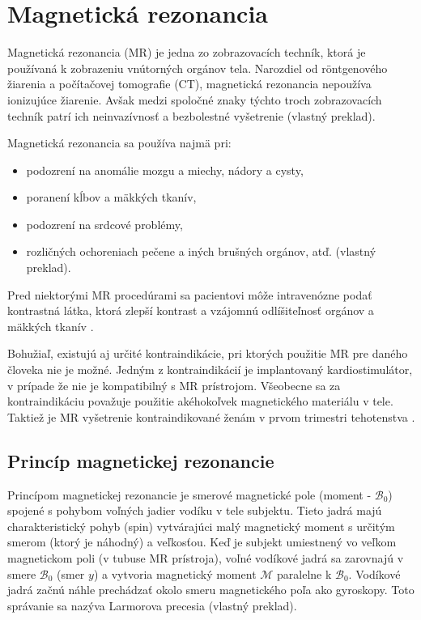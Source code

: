 \chapter {Magnetická rezonancia}
Magnetická rezonancia (MR) je jedna zo zobrazovacích techník, ktorá je používaná k zobrazeniu vnútorných orgánov tela.
Narozdiel od röntgenového žiarenia a počítačovej tomografie (CT), magnetická rezonancia nepoužíva ionizujúce žiarenie. Avšak medzi spoločné znaky týchto troch zobrazovacích techník patrí ich neinvazívnosť a bezbolestné vyšetrenie \cite{basic_principles_of_mri} (vlastný preklad).

Magnetická rezonancia sa používa najmä pri:
\begin {itemize}
\item {podozrení na anomálie mozgu a miechy, nádory a cysty,}
\item {poranení kĺbov a mäkkých tkanív,}
\item {podozrení na srdcové problémy,}
\item {rozličných ochoreniach pečene a iných brušných orgánov, atď. \cite{mr_usage} (vlastný preklad).}
\end {itemize}

Pred niektorými MR procedúrami sa pacientovi môže intravenózne podať kontrastná látka, ktorá zlepší kontrast a vzájomnú odlíšiteľnosť orgánov a mäkkých tkanív \cite{contrast_agents}.

Bohužiaľ, existujú aj určité kontraindikácie, pri ktorých použitie MR pre daného človeka nie je možné.
Jedným z kontraindikácií je implantovaný kardiostimulátor, v prípade že nie je kompatibilný s MR prístrojom. Všeobecne sa za kontraindikáciu považuje použitie akéhokoľvek magnetického materiálu v tele. Taktiež je MR vyšetrenie kontraindikované ženám v prvom trimestri tehotenstva \cite{mr_contraindications}.

\clearpage

\section {Princíp magnetickej rezonancie}
Princípom magnetickej rezonancie je smerové magnetické pole (moment - $\mathcal{B}_{0}$) spojené s pohybom voľných jadier vodíku v tele subjektu. Tieto jadrá majú charakteristický pohyb (spin) vytvárajúci malý magnetický moment s určitým smerom (ktorý je náhodný) a veľkosťou. Keď je subjekt umiestnený vo veľkom magnetickom poli (v tubuse MR prístroja), voľné vodíkové jadrá sa zarovnajú v smere $\mathcal{B}_{0}$ (smer $y$) a vytvoria magnetický moment $\mathcal{M}$ paralelne k $\mathcal{B}_{0}$. Vodíkové jadrá začnú náhle prechádzať okolo smeru magnetického poľa ako gyroskopy. Toto správanie sa nazýva Larmorova precesia \cite{basic_principles_of_mri} (vlastný preklad).

